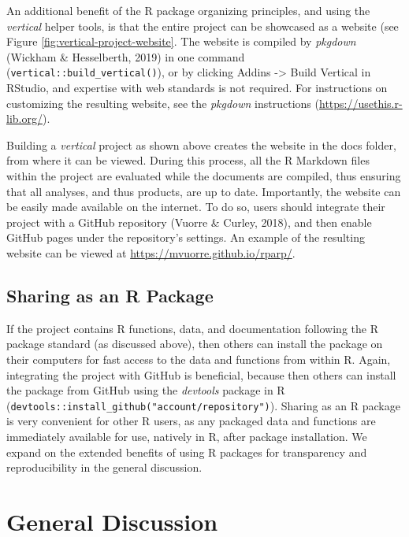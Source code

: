 \documentclass[
  english,
  jou,floatsintext]{apa6}
\begin{document}
An additional benefit of the R package organizing principles, and using the \emph{vertical} helper tools, is that the entire project can be showcased as a website (see Figure \ref{fig:vertical-project-website}. The website is compiled by \emph{pkgdown} (Wickham \& Hesselberth, 2019) in one command (\texttt{vertical::build\_vertical()}), or by clicking Addins -\textgreater{} Build Vertical in RStudio, and expertise with web standards is not required. For instructions on customizing the resulting website, see the \emph{pkgdown} instructions (\url{https://usethis.r-lib.org/}).

Building a \emph{vertical} project as shown above creates the website in the docs folder, from where it can be viewed. During this process, all the R Markdown files within the project are evaluated while the documents are compiled, thus ensuring that all analyses, and thus products, are up to date. Importantly, the website can be easily made available on the internet. To do so, users should integrate their project with a GitHub repository (Vuorre \& Curley, 2018), and then enable GitHub pages under the repository's settings. An example of the resulting website can be viewed at \url{https://mvuorre.github.io/rparp/}.

\hypertarget{sharing-as-an-r-package}{%
\subsection{Sharing as an R Package}\label{sharing-as-an-r-package}}

If the project contains R functions, data, and documentation following the R package standard (as discussed above), then others can install the package on their computers for fast access to the data and functions from within R. Again, integrating the project with GitHub is beneficial, because then others can install the package from GitHub using the \emph{devtools} package in R (\texttt{devtools::install\_github("account/repository")}). Sharing as an R package is very convenient for other R users, as any packaged data and functions are immediately available for use, natively in R, after package installation. We expand on the extended benefits of using R packages for transparency and reproducibility in the general discussion.

\hypertarget{general-discussion}{%
\section{General Discussion}\label{general-discussion}}
\end{document}
